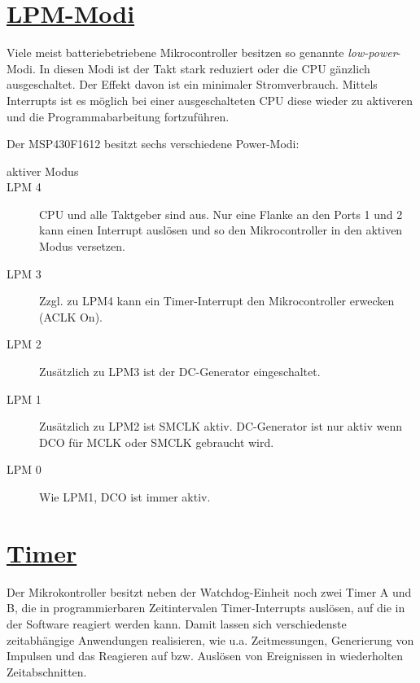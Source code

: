 \documentclass[11pt,german]{scrartcl}
\begin{document}
\clearpage
\section
{\href{http://cst.mi.fu-berlin.de/intern/19606-P-MPP/Aufgaben/040500.html}
{LPM-Modi}}

Viele meist batteriebetriebene Mikrocontroller besitzen so genannte \emph{low-power}-Modi.
In diesen Modi ist der Takt stark reduziert oder die CPU gänzlich ausgeschaltet. Der Effekt davon ist ein minimaler Stromverbrauch.
Mittels Interrupts ist es möglich bei einer ausgeschalteten CPU diese wieder zu aktiveren und die Programmabarbeitung fortzuführen.

Der MSP430F1612 besitzt sechs verschiedene Power-Modi:
\begin{description}
    \item [aktiver Modus]
    \item [LPM 4]  CPU und alle Taktgeber sind aus. Nur eine Flanke an den Ports 1 und 2 kann einen Interrupt auslösen und so den Mikrocontroller in den aktiven Modus versetzen.
    \item [LPM 3] Zzgl. zu LPM4 kann ein Timer-Interrupt den Mikrocontroller erwecken (ACLK On).
    \item [LPM 2] Zusätzlich zu LPM3 ist der DC-Generator eingeschaltet.
    \item [LPM 1] Zusätzlich zu LPM2 ist SMCLK aktiv. DC-Generator ist nur aktiv wenn DCO für MCLK oder SMCLK gebraucht wird.
    \item [LPM 0] Wie LPM1, DCO ist immer aktiv.
\end{description}






\clearpage
\section
{\href{http://cst.mi.fu-berlin.de/intern/19606-P-MPP/Aufgaben/040600.html}
{Timer}}

Der Mikrokontroller besitzt neben der Watchdog-Einheit noch zwei Timer A und B, die in programmierbaren Zeitintervalen Timer-Interrupts auslösen, auf die in der Software reagiert werden kann. Damit lassen sich verschiedenste zeitabhängige Anwendungen realisieren, wie u.a. Zeitmessungen, Generierung von Impulsen und das Reagieren auf bzw. Auslösen von Ereignissen in wiederholten Zeitabschnitten.
\end{document}
